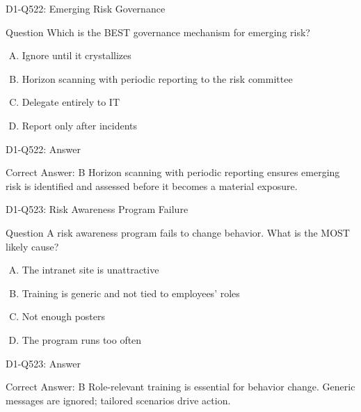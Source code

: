 \documentclass{beamer}
\begin{document}
\begin{frame}{D1-Q522: Emerging Risk Governance}
	\begin{block}{Question}
		Which is the BEST governance mechanism for emerging risk?
	\end{block}
	\begin{enumerate}[(A)]
		\item Ignore until it crystallizes
		\item Horizon scanning with periodic reporting to the risk committee
		\item Delegate entirely to IT
		\item Report only after incidents
	\end{enumerate}
\end{frame}
\begin{frame}{D1-Q522: Answer}
	\begin{block}{Correct Answer: B}
		Horizon scanning with periodic reporting ensures emerging risk is identified and assessed before it becomes a material exposure.
	\end{block}
\end{frame}

\begin{frame}{D1-Q523: Risk Awareness Program Failure}
	\begin{block}{Question}
		A risk awareness program fails to change behavior. What is the MOST likely cause?
	\end{block}
	\begin{enumerate}[(A)]
		\item The intranet site is unattractive
		\item Training is generic and not tied to employees' roles
		\item Not enough posters
		\item The program runs too often
	\end{enumerate}
\end{frame}
\begin{frame}{D1-Q523: Answer}
	\begin{block}{Correct Answer: B}
		Role-relevant training is essential for behavior change. Generic messages are ignored; tailored scenarios drive action.
	\end{block}
\end{frame}
\end{document}

